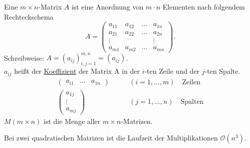 \begin{definition}
    [Matrix] Eine $m\times n$-Matrix $A$ ist eine Anordnung von $m\cdot n$ Elementen nach folgendem Rechteckschema
    \[
        A = \begin{pmatrix}
            a_{11} & a_{12} & \dots & a_{1n}\\
            a_{21} & a_{22} & \dots & a_{2n}\\
            \vdots & & & \vdots\\
            a_{m1} & a_{m2} & \dots & a_{mn}
        \end{pmatrix}.
    \]
    Schreibweise: $A=(a_{ij})^{m,n}_{i,j=1} = (a_{ij})$.\\
    $a_{ij}$ heißt der \underline{Koeffizient} der Matrix A in der $i$-ten Zeile und der $j$-ten Spalte.
    \begin{align*}
        \begin{pmatrix}
            a_{i1} & \dots & a_{1n}
        \end{pmatrix}\qquad&(i = 1,\dots,m)\quad\text{Zeilen}\\
        \begin{pmatrix}
            a_{1j}\\
            \vdots\\
            a_{mj}
        \end{pmatrix}\qquad&(j=1,\dots,n)\quad\text{Spalten}
    \end{align*}
    $M(m\times n)$ ist die Menge aller $m\times n$-Matrizen.
\end{definition}
\begin{definition}
     Bei zwei quadratischen Matrizen ist die Laufzeit 
    der Multiplikationen $\mathcal{O}(n^3)$.
\end{definition}